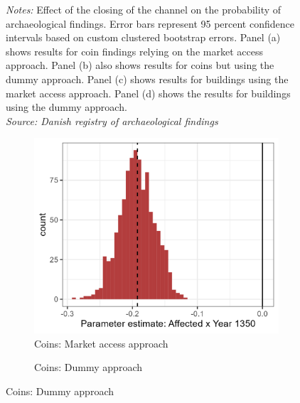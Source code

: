 \documentclass[11pt]{article}
\begin{document}
\begin{figure}[h!]
\begin{subfigure}[b]{0.45\textwidth}
    \end{subfigure}
    \parbox{0.9\textwidth}{
    \caption*{\footnotesize \textit{Notes:} Effect of the closing of the channel on the probability of archaeological findings. Error bars represent 95 percent confidence intervals based on custom clustered bootstrap errors. Panel (a) shows results for coin findings relying on the market access approach. Panel (b) also shows results for coins but using the dummy approach. Panel (c) shows results for buildings using the market access approach. Panel (d) shows the results for buildings using the dummy approach.  \\ \textit{Source: Danish registry of archaeological findings}}
}    \label{fig:arch_reg}
\end{figure}


\begin{figure}[h!]
    \centering
    \caption{Distribution of parameter estimates in 1350}
    \begin{subfigure}[b]{0.45\textwidth}
        \centering
        \caption{\label{fig:distri_a} Coins: Market access approach}
        \includegraphics[width=\textwidth]{Plots/Regression_plots/arch_MA_coins_boot.png}
    \end{subfigure}
    \hfill
    \begin{subfigure}[b]{0.45\textwidth}
        \centering
        \caption{\label{fig:distri_b} Coins: Dummy approach}

\end{subfigure}
\end{figure}
\end{document}

